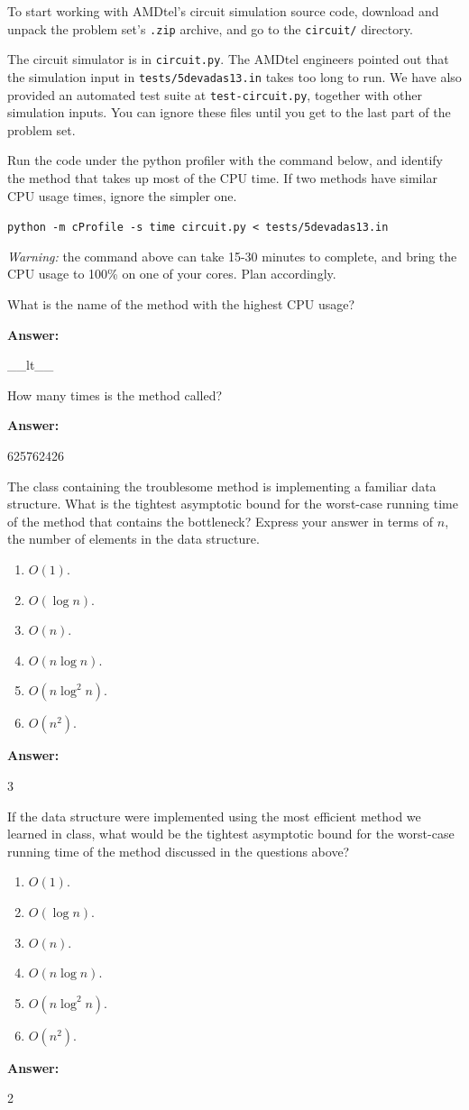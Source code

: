 \documentclass[12pt,twoside]{article}
\newcommand{\answer}{
 \par\medskip
 \textbf{Answer:}
}
\newcommand{\answerIIa}{ \answer 
__lt__
}
\newcommand{\answerIIb}{ \answer
625762426
}
\newcommand{\answerIIc}{ \answer
3
}
\newcommand{\answerIId}{ \answer
2
}
\begin{document}
\begin{problems}
To start working with AMDtel's circuit simulation source code, download and
unpack the problem set's \texttt{.zip} archive, and go to the \texttt{circuit/}
directory.

The circuit simulator is in \texttt{circuit.py}. The AMDtel engineers pointed
out that the simulation input in \texttt{tests/5devadas13.in} takes too long
to run. We have also provided an automated test suite at
\texttt{test-circuit.py}, together with other simulation inputs. You can ignore
these files until you get to the last part of the problem set.

\begin{problemparts}

\problempart {} Run the code under the python profiler with the command
below, and identify the method that takes up most of the CPU time. If two
methods have similar CPU usage times, ignore the simpler one.

\texttt{python -m cProfile -s time circuit.py < tests/5devadas13.in}

\textit{Warning:} the command above can take 15-30 minutes to complete, and
bring the CPU usage to 100\% on one of your cores. Plan accordingly.

What is the name of the method with the highest CPU usage?
\answerIIa


\problempart {} How many times is the method called?
\answerIIb

\problempart {} The class containing the troublesome method is
implementing a familiar data structure. What is the tightest asymptotic bound
for the worst-case running time of the method that contains the bottleneck?
Express your answer in terms of $n$, the number of elements in the data
structure.
\begin{enumerate}
  \item $O(1)$.
  \item $O(\log n)$.
  \item $O(n)$.
  \item $O(n \log n)$.
  \item $O(n \log^2 n)$.
  \item $O(n^2)$.
\end{enumerate}
\answerIIc 

\problempart {} If the data structure were implemented using the most
efficient method we learned in class, what would be the tightest asymptotic
bound for the worst-case running time of the method discussed in the questions
above?
\begin{enumerate}
  \item $O(1)$.
  \item $O(\log n)$.
  \item $O(n)$.
  \item $O(n \log n)$.
  \item $O(n \log^2 n)$.
  \item $O(n^2)$.
\end{enumerate}
\answerIId


\end{problemparts}
\end{problems}
\end{document}
